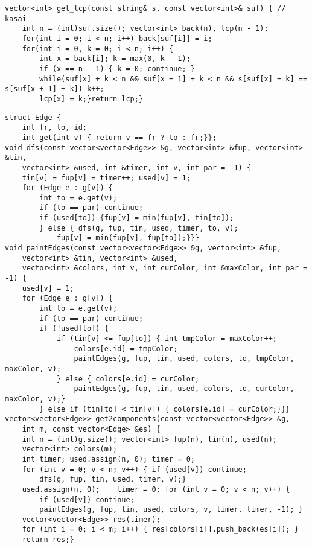 \documentclass[a4paper,12pt]{article}
\begin{document}
\begin{verbatim}
vector<int> get_lcp(const string& s, const vector<int>& suf) { // kasai
    int n = (int)suf.size(); vector<int> back(n), lcp(n - 1);
    for(int i = 0; i < n; i++) back[suf[i]] = i;
    for(int i = 0, k = 0; i < n; i++) {
        int x = back[i]; k = max(0, k - 1);
        if (x == n - 1) { k = 0; continue; }
        while(suf[x] + k < n && suf[x + 1] + k < n && s[suf[x] + k] == s[suf[x + 1] + k]) k++;
        lcp[x] = k;}return lcp;}
\end{verbatim}

\begin{verbatim}
struct Edge {
    int fr, to, id;
    int get(int v) { return v == fr ? to : fr;}};
void dfs(const vector<vector<Edge>> &g, vector<int> &fup, vector<int> &tin, 
    vector<int> &used, int &timer, int v, int par = -1) {
    tin[v] = fup[v] = timer++; used[v] = 1;
    for (Edge e : g[v]) {
        int to = e.get(v);
        if (to == par) continue;
        if (used[to]) {fup[v] = min(fup[v], tin[to]);
        } else { dfs(g, fup, tin, used, timer, to, v);
            fup[v] = min(fup[v], fup[to]);}}}
void paintEdges(const vector<vector<Edge>> &g, vector<int> &fup, 
    vector<int> &tin, vector<int> &used,
    vector<int> &colors, int v, int curColor, int &maxColor, int par = -1) {
    used[v] = 1;
    for (Edge e : g[v]) {
        int to = e.get(v);
        if (to == par) continue;
        if (!used[to]) {
            if (tin[v] <= fup[to]) { int tmpColor = maxColor++;
                colors[e.id] = tmpColor;
                paintEdges(g, fup, tin, used, colors, to, tmpColor, maxColor, v);
            } else { colors[e.id] = curColor;
                paintEdges(g, fup, tin, used, colors, to, curColor, maxColor, v);}
        } else if (tin[to] < tin[v]) { colors[e.id] = curColor;}}}
vector<vector<Edge>> get2components(const vector<vector<Edge>> &g, 
    int m, const vector<Edge> &es) {
    int n = (int)g.size(); vector<int> fup(n), tin(n), used(n); 
    vector<int> colors(m);
    int timer; used.assign(n, 0); timer = 0;
    for (int v = 0; v < n; v++) { if (used[v]) continue;
        dfs(g, fup, tin, used, timer, v);}
    used.assign(n, 0);    timer = 0; for (int v = 0; v < n; v++) {
        if (used[v]) continue;
        paintEdges(g, fup, tin, used, colors, v, timer, timer, -1); }
    vector<vector<Edge>> res(timer);
    for (int i = 0; i < m; i++) { res[colors[i]].push_back(es[i]); }
    return res;}
\end{verbatim}
\end{document}
